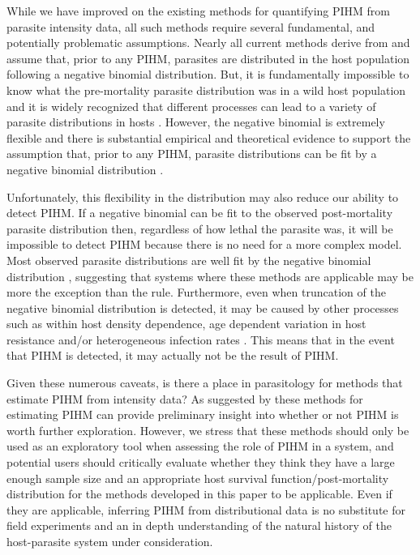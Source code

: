 \documentclass[12pt, a4paper]{article}
\begin{document}
While we have improved on the existing methods for quantifying
PIHM from parasite intensity data, all such methods require several
fundamental, and potentially problematic assumptions.  Nearly all current methods derive from \cite{Crofton1971a} \citep[but see][]{Ferguson2011} and assume that, prior to any PIHM, parasites are distributed in the host population following a
negative binomial distribution. But, it is fundamentally impossible to know
what the pre-mortality parasite distribution was in a wild host population and
it is widely recognized that different processes can lead to a variety of
parasite distributions in hosts \citep{Anderson1982a, Duerr2003}. However, the negative binomial is extremely
flexible and there is substantial empirical and theoretical evidence to support
the assumption that, prior to any PIHM, parasite distributions can be fit by a negative binomial distribution \citep{Shaw1995,Shaw1998,Wilson2002}.

Unfortunately, this
flexibility in the distribution may also reduce our ability to detect PIHM. If
a negative binomial can be fit to the observed post-mortality parasite
distribution then, regardless of how lethal the parasite was, it will be
impossible to detect PIHM because there is no need for a more complex model.
Most observed parasite distributions are well fit by the negative binomial distribution \citep{Shaw1998}, suggesting
that systems where these methods are applicable may be more the exception than
the rule.  Furthermore, even when truncation of the negative binomial distribution is detected, it may be caused by other
processes such as within host density dependence, age dependent variation in host
resistance and/or heterogeneous infection rates \citep{Anderson1982a,Rousset1996, McCallum2000a}.  This means that in the event
that PIHM is detected, it may actually not be the result of PIHM.

Given these numerous caveats, is there a place in parasitology for methods that
estimate PIHM from intensity data?  As suggested by
\cite{Lester1984} these methods for estimating PIHM can
provide preliminary insight into whether or not PIHM is worth further
exploration.  However, we stress that these methods should only be used as an
exploratory tool when assessing the role of PIHM in a system, and potential
users should critically evaluate whether they think they have a large enough
sample size and an appropriate host survival function/post-mortality distribution for the methods developed
in this paper to be applicable.  Even if they are applicable, inferring PIHM
from distributional data is no substitute for field experiments
and an in depth understanding of the natural history of the host-parasite
system under consideration.
\end{document}
